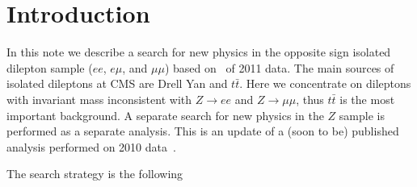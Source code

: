 \section{Introduction}
\label{sec:intro}

In this note we describe a search for new physics in the
opposite sign isolated dilepton sample ($ee$, $e\mu$, and $\mu\mu$)
based on \lumi\ of 2011 data.
The main sources of 
isolated dileptons at CMS are Drell Yan and $t\bar{t}$.
Here we concentrate on dileptons with invariant mass inconsistent
with $Z \to ee$ and $Z \to \mu\mu$, thus $t\bar{t}$ is the most
important background.  A separate search for new physics in the $Z$ 
sample is performed as a separate analysis.
This is an update of a (soon to be) published analysis performed 
on 2010 data~\cite{ref:osnote,ref:ospaper}. 

The search strategy is the following

